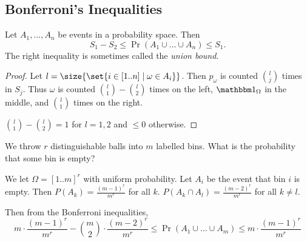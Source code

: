 \subsection{Bonferroni's Inequalities} \label{sec:bonferroni}
\begin{theorem} \label{thm:prob:bonferroni}
    Let $A_1, \dots, A_n$ be events in a probability space.
    Then \[
        S_1 - S_2 \leq \Pr(A_1 \cup \dots \cup A_n) \leq S_1.
    \] The right inequality is sometimes called the \emph{union bound}.
\end{theorem}
\begin{proof}
    Let $l = \size{\set{i \in [1..n] \mid \omega \in A_i}}$.
    Then $p_\omega$ is counted $\binom{l}{j}$ times in $S_j$.
    Thus $\omega$ is counted $\binom{l}{1} - \binom{l}{2}$ times on the left,
    $\ind{\Omega}$ in the middle, and $\binom{l}{1}$ times on the right.

    $\binom{l}{1} - \binom{l}{2} = 1$ for $l = 1, 2$ and $\leq 0$ otherwise.
\end{proof}
\begin{example}
    We throw $r$ distinguishable balls into $m$ labelled bins.
    What is the probability that some bin is empty?

    We let $\Omega = [1..m]^{r}$ with uniform probability.
    Let $A_i$ be the event that bin $i$ is empty.
    Then $P(A_{k}) = \frac{(m - 1)^{r}}{m^{r}}$ for all $k$.
    $P(A_{k} \cap A_{l}) = \frac{(m - 2)^{r}}{m^{r}}$ for all $k \neq l$.
    
    Then from the Bonferroni inequalities,
    \begin{equation*}
        m \cdot \frac{(m - 1)^r}{m^r} - \binom{m}{2} \cdot \frac{(m - 2)^r}{m^r}
            \leq \Pr(A_1 \cup \dots \cup A_m)
            \leq m \cdot \frac{(m - 1)^r}{m^r}
    \end{equation*}
\end{example}
